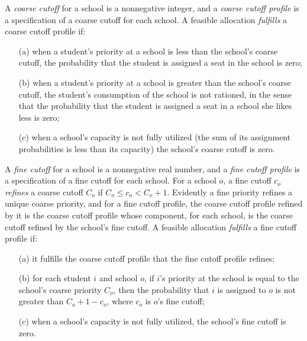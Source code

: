 \documentclass[12pt]{article}
\theoremstyle{definition}
\begin{document}
A \emph{coarse cutoff} for a school is a nonnegative integer, and a
\emph{coarse cutoff profile} is a specification of a coarse cutoff for
each school.  A feasible allocation \emph{fulfills} a coarse cutoff profile if:
\begin{enumerate}
  \item[(a)] when a student's priority at a school is less than the
    school's coarse cutoff, the probability that the student is
    assigned a seat in the school is zero;
  \item[(b)] when a student's priority at a school is greater than the
    school's coarse cutoff, the student's consumption of the school is
    not rationed, in the sense that the probability that the student
    is assigned a seat in a school she likes less is zero;
  \item[(c)] when a school's capacity is not fully utilized (the sum
    of its assignment probabilities is less than its capacity) the
    school's coarse cutoff is zero.
\end{enumerate}
 
A \emph{fine cutoff} for a school is a nonnegative real number, and a
\emph{fine cutoff profile} is a specification of a fine cutoff for
each school.  For a school $o$, a fine cutoff $c_o$ \emph{refines} a
coarse cutoff $C_o$ if $C_o \le c_o < C_o + 1$.  Evidently a fine
priority refines a unique coarse priority, and for a fine cutoff
profile, the coarse cutoff profile refined by it is the coarse cutoff
profile whose component, for each school, is the coarse cutoff refined
by the school's fine cutoff.  A feasible allocation \emph{fulfills} a
fine cutoff profile if:
\begin{enumerate}
  \item[(a)] it fulfills the coarse cutoff profile that the fine
    cutoff profile refines;
  \item[(b)] for each student $i$ and school $o$, if $i$'s priority at
    the school is equal to the school's coarse priority $C_o$, then
    the probability that $i$ is assigned to $o$ is not greater than
    $C_o + 1 - c_o$, where $c_o$ is $o$'s fine cutoff;
  \item[(c)] when a school's capacity is not fully utilized, the
    school's fine cutoff is zero.
\end{enumerate}
\end{document}
